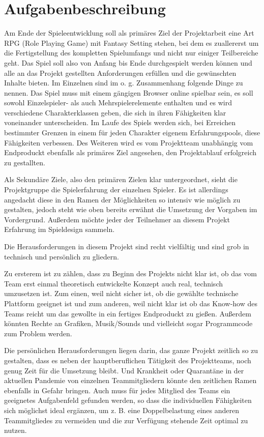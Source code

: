 

\section{Aufgabenbeschreibung}


Am Ende der Spieleentwicklung soll als primäres Ziel der Projektarbeit eine Art RPG (Role Playing Game) mit Fantasy Setting stehen, bei dem es zuallererst um die Fertigstellung des kompletten Spielumfangs und nicht nur einiger Teilbereiche geht. Das Spiel soll also von Anfang bis Ende durchgespielt werden können und alle an das Projekt gestellten Anforderungen erfüllen und die gewünschten Inhalte bieten. Im Einzelnen sind im o. g. Zusammenhang folgende Dinge zu nennen. Das Spiel muss mit einem gängigen Browser online spielbar sein, es soll sowohl Einzelspieler- als auch Mehrspielerelemente enthalten und es wird verschiedene Charakterklassen geben, die sich in ihren Fähigkeiten klar voneinander unterscheiden. Im Laufe des Spiels werden sich, bei Erreichen bestimmter Grenzen in einem für jeden Charakter eigenem Erfahrungspools, diese Fähigkeiten verbessen. Des Weiteren wird es vom Projektteam unabhängig vom Endproduckt ebenfalls als primäres Ziel angesehen, den Projektablauf erfolgreich zu gestallten.

Als Sekundäre Ziele, also den primären Zielen klar untergeordnet, sieht die Projektgruppe die Spielerfahrung der einzelnen Spieler. Es ist allerdings angedacht diese in den Ramen der Möglichkeiten so intensiv wie möglich zu gestalten, jedoch steht wie oben bereits erwähnt die Umsetzung der Vorgaben im Vordergrund. Außerdem möchte jeder der Teilnehmer an diesem Projekt Erfahrung im Spieldesign sammeln.

Die Herausforderungen in diesem Projekt sind recht vielfältig und sind grob in technisch und persönlich zu gliedern.

Zu ersterem ist zu zählen, dass zu Beginn des Projekts nicht klar ist, ob das vom Team erst einmal theoretisch entwickelte Konzept auch real, technisch umzusetzen ist. Zum einen, weil nicht sicher ist, ob die gewählte technische Plattform geeignet ist und zum anderen, weil nicht klar ist ob das Know-how des Teams reicht um das gewollte in ein fertiges Endproduckt zu gießen. Außerdem könnten Rechte an Grafiken, Musik/Sounds und vielleicht sogar Programmcode zum Problem werden.

Die persönlichen Herausforderungen liegen darin, das ganze Projekt zeitlich so zu gestalten, dass es neben der hauptberuflichen Tätigkeit des Projektteams, noch genug Zeit für die Umsetzung bleibt. Und Krankheit oder Quarantäne in der aktuellen Pandemie von einzelnen Teammitgliedern könnte den zeitlichen Ramen ebenfalls in Gefahr bringen. Auch muss für jedes Mitglied des Teams ein geeignetes Aufgabenfeld gefunden werden, so dass die individuellen Fähigkeiten sich möglichst ideal ergänzen, um z. B. eine Doppelbelastung eines anderen Teammitgliedes zu vermeiden und die zur Verfügung stehende Zeit optimal zu nutzen.




